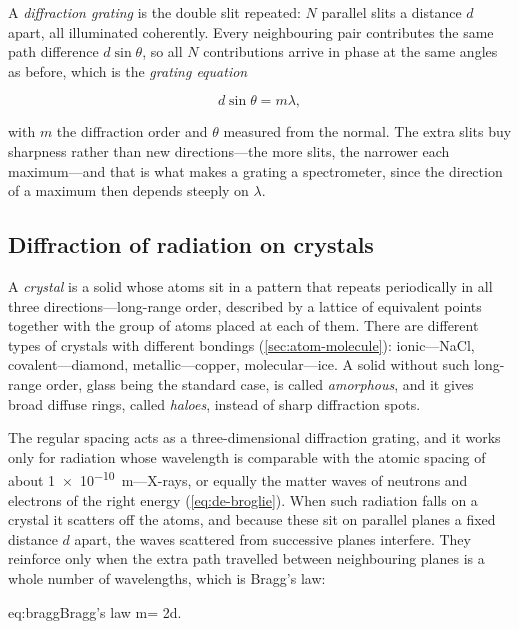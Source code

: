         A \emph{diffraction grating} is the double slit repeated: $N$ parallel slits a distance $d$ apart, all illuminated coherently. Every neighbouring pair contributes the same path difference $d\sin\theta$, so all $N$ contributions arrive in phase at the same angles as before, which is the \emph{grating equation}

        \begin{equation*}
            d\sin\theta = m\lambda,
        \end{equation*}

        with $m$ the diffraction order and $\theta$ measured from the normal. The extra slits buy sharpness rather than new directions---the more slits, the narrower each maximum---and that is what makes a grating a spectrometer, since the direction of a maximum then depends steeply on $\lambda$.

    \subsection{Diffraction of radiation on crystals}

        A \emph{crystal} is a solid whose atoms sit in a pattern that repeats periodically in all three directions---long-range order, described by a lattice of equivalent points together with the group of atoms placed at each of them. There are different types of crystals with different bondings (\cref{sec:atom-molecule}): ionic---NaCl, covalent---diamond, metallic---copper, molecular---ice. A solid without such long-range order, glass being the standard case, is called \emph{amorphous}, and it gives broad diffuse rings, called \emph{haloes}, instead of sharp diffraction spots.

        The regular spacing acts as a three-dimensional diffraction grating, and it works only for radiation whose wavelength is comparable with the atomic spacing of about \qty{1e-10}{\metre}---X-rays, or equally the matter waves of neutrons and electrons of the right energy (\cref{eq:de-broglie}). When such radiation falls on a crystal it scatters off the atoms, and because these sit on parallel planes a fixed distance $d$ apart, the waves scattered from successive planes interfere. They reinforce only when the extra path travelled between neighbouring planes is a whole number of wavelengths, which is Bragg's law:

        \begin{keyeq}{eq:bragg}{Bragg's law}
            m\lambda = 2d\sin\theta.
        \end{keyeq}

